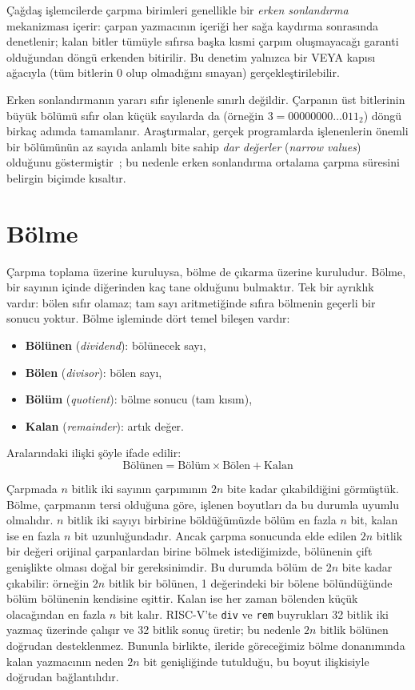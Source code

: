 Çağdaş işlemcilerde çarpma birimleri genellikle bir \emph{erken sonlandırma} mekanizması içerir: çarpan yazmacının içeriği her sağa kaydırma sonrasında denetlenir; kalan bitler tümüyle sıfırsa başka kısmi çarpım oluşmayacağı garanti olduğundan döngü erkenden bitirilir. Bu denetim yalnızca bir VEYA kapısı ağacıyla (tüm bitlerin 0 olup olmadığını sınayan) gerçekleştirilebilir.

Erken sonlandırmanın yararı sıfır işlenenle sınırlı değildir. Çarpanın üst bitlerinin büyük bölümü sıfır olan küçük sayılarda da (örneğin $3 = 00000000\ldots011_2$) döngü birkaç adımda tamamlanır. Araştırmalar, gerçek programlarda işlenenlerin önemli bir bölümünün az sayıda anlamlı bite sahip \emph{dar değerler} (\emph{narrow values}) olduğunu göstermiştir~\cite{ergin2004}; bu nedenle erken sonlandırma ortalama çarpma süresini belirgin biçimde kısaltır.


\section{Bölme}
\label{sec:bolme}

Çarpma toplama üzerine kuruluysa, bölme de çıkarma üzerine kuruludur. Bölme, bir sayının içinde diğerinden kaç tane olduğunu bulmaktır. Tek bir ayrıklık vardır: bölen sıfır olamaz; tam sayı aritmetiğinde sıfıra bölmenin geçerli bir sonucu yoktur. Bölme işleminde dört temel bileşen vardır:
%
\begin{itemize}
\item \textbf{Bölünen} (\emph{dividend}): bölünecek sayı,
\item \textbf{Bölen} (\emph{divisor}): bölen sayı,
\item \textbf{Bölüm} (\emph{quotient}): bölme sonucu (tam kısım),
\item \textbf{Kalan} (\emph{remainder}): artık değer.
\end{itemize}

Aralarındaki ilişki şöyle ifade edilir:
\[
\text{Bölünen} = \text{Bölüm} \times \text{Bölen} + \text{Kalan}
\]

Çarpmada $n$ bitlik iki sayının çarpımının $2n$ bite kadar çıkabildiğini görmüştük. Bölme, çarpmanın tersi olduğuna göre, işlenen boyutları da bu durumla uyumlu olmalıdır. $n$ bitlik iki sayıyı birbirine böldüğümüzde bölüm en fazla $n$ bit, kalan ise en fazla $n$ bit uzunluğundadır. Ancak çarpma sonucunda elde edilen $2n$ bitlik bir değeri orijinal çarpanlardan birine bölmek istediğimizde, bölünenin çift genişlikte olması doğal bir gereksinimdir. Bu durumda bölüm de $2n$ bite kadar çıkabilir: örneğin $2n$ bitlik bir bölünen, 1 değerindeki bir bölene bölündüğünde bölüm bölünenin kendisine eşittir. Kalan ise her zaman bölenden küçük olacağından en fazla $n$ bit kalır. RISC-V'te \texttt{div} ve \texttt{rem} buyrukları 32 bitlik iki yazmaç üzerinde çalışır ve 32 bitlik sonuç üretir; bu nedenle $2n$ bitlik bölünen doğrudan desteklenmez. Bununla birlikte, ileride göreceğimiz bölme donanımında kalan yazmacının neden $2n$ bit genişliğinde tutulduğu, bu boyut ilişkisiyle doğrudan bağlantılıdır.

